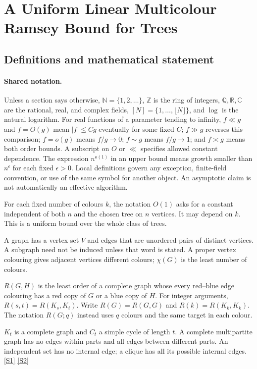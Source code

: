\documentclass[11pt,a4paper]{article}
\newcommand{\N}{\mathbb{N}}
\newcommand{\Z}{\mathbb{Z}}
\newcommand{\Q}{\mathbb{Q}}
\newcommand{\R}{\mathbb{R}}
\newcommand{\C}{\mathbb{C}}
\newcommand{\sref}[2]{\hyperlink{source:#1:#2}{[S#2]}}
\begin{document}
\section{A Uniform Linear Multicolour Ramsey Bound for Trees}\label{statement}


\subsection{Definitions and mathematical statement}

\paragraph{Shared notation.}Unless a section says otherwise, $\N=\{1,2,\ldots\}$,
$\Z$ is the ring of integers, $\Q,\R,\C$ are the rational, real, and complex
fields, $[N]=\{1,\ldots,\lfloor N\rfloor\}$, and $\log$ is the natural
logarithm. For real functions of a parameter tending to infinity,
$f\ll g$ and $f=O(g)$ mean $|f|\leq Cg$ eventually for some fixed $C$;
$f\gg g$ reverses this comparison; $f=o(g)$ means $f/g\to0$;
$f\sim g$ means $f/g\to1$; and $f\asymp g$ means both order bounds.
A subscript on $O$ or $\ll$ specifies allowed constant dependence.
The expression $n^{o(1)}$ in an upper bound means growth smaller than
$n^\epsilon$ for each fixed $\epsilon>0$. Local definitions govern any
exception, finite-field convention, or use of the same symbol for another
object. An asymptotic claim is not automatically an effective algorithm.



For each fixed number of colours $k$, the notation $O(1)$ asks for a constant independent of both $n$ and the chosen tree on $n$ vertices. It may depend on $k$. This is a uniform bound over the whole class of trees.

A graph has a vertex set $V$ and edges that are unordered pairs of distinct vertices. A subgraph need not be induced unless that word is stated. A proper vertex colouring gives adjacent vertices different colours; $\chi(G)$ is the least number of colours.

$R(G,H)$ is the least order of a complete graph whose every red--blue edge colouring has a red copy of $G$ or a blue copy of $H$. For integer arguments, $R(s,t)=R(K_s,K_t)$. Write $R(G)=R(G,G)$ and $R(k)=R(K_k,K_k)$. The notation $R(G;q)$ instead uses $q$ colours and the same target in each colour.

$K_t$ is a complete graph and $C_t$ a simple cycle of length $t$. A complete multipartite graph has no edges within parts and all edges between different parts. An independent set has no internal edge; a clique has all its possible internal edges. \sref{statement}{1} \sref{statement}{2}
\end{document}

